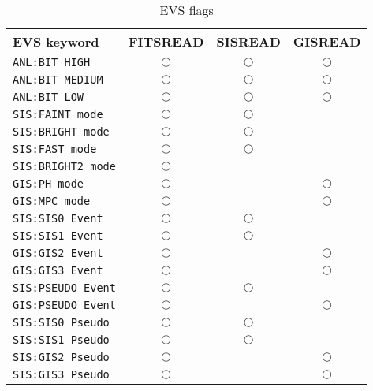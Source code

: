 \begin{table}[htb]
\begin{center}
\begin{tabular}{|l||c|c|c|} \hline
EVS keyword       & FITSREAD   & SISREAD    & GISREAD    \\ \hline \hline
{\tt ANL:BIT HIGH}      & $\bigcirc$ & $\bigcirc$ & $\bigcirc$ \\ \hline
{\tt ANL:BIT MEDIUM}    & $\bigcirc$ & $\bigcirc$ & $\bigcirc$ \\ \hline
{\tt ANL:BIT LOW}       & $\bigcirc$ & $\bigcirc$ & $\bigcirc$ \\ \hline
{\tt SIS:FAINT mode}    & $\bigcirc$ & $\bigcirc$ &            \\ \hline
{\tt SIS:BRIGHT mode}   & $\bigcirc$ & $\bigcirc$ &            \\ \hline
{\tt SIS:FAST mode}     & $\bigcirc$ & $\bigcirc$ &            \\ \hline
{\tt SIS:BRIGHT2 mode}  & $\bigcirc$ &            &            \\ \hline
{\tt GIS:PH mode}       & $\bigcirc$ &            & $\bigcirc$ \\ \hline
{\tt GIS:MPC mode}      & $\bigcirc$ &            & $\bigcirc$ \\ \hline
{\tt SIS:SIS0 Event}    & $\bigcirc$ & $\bigcirc$ &            \\ \hline
{\tt SIS:SIS1 Event}    & $\bigcirc$ & $\bigcirc$ &            \\ \hline
{\tt GIS:GIS2 Event}    & $\bigcirc$ &            & $\bigcirc$ \\ \hline
{\tt GIS:GIS3 Event}    & $\bigcirc$ &            & $\bigcirc$ \\ \hline
{\tt SIS:PSEUDO Event}  & $\bigcirc$ & $\bigcirc$ &            \\ \hline
{\tt GIS:PSEUDO Event}  & $\bigcirc$ &            & $\bigcirc$ \\ \hline
{\tt SIS:SIS0 Pseudo}   & $\bigcirc$ & $\bigcirc$ &            \\ \hline
{\tt SIS:SIS1 Pseudo}   & $\bigcirc$ & $\bigcirc$ &            \\ \hline
{\tt SIS:GIS2 Pseudo}   & $\bigcirc$ &            & $\bigcirc$ \\ \hline
{\tt SIS:GIS3 Pseudo}   & $\bigcirc$ &            & $\bigcirc$ \\ \hline
\end{tabular}
\caption{EVS flags}
\label{tab:EVS-list}
\end{center}
\end{table}


